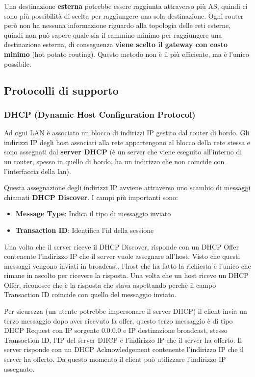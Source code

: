 \documentclass[a4paper]{article}
\begin{document}
\vspace{1em}
\noindent
Una destinazione \textbf{esterna} potrebbe essere raggiunta attraverso più AS, quindi ci
sono più possibilità di scelta per raggiungere una sola destinazione. Ogni router però non
ha nessuna informazione riguardo alla topologia delle reti esterne, quindi non può sapere
quale sia il cammino minimo per raggiungere una destinazione esterna, di conseguenza 
\textbf{viene scelto il gateway con costo minimo} (hot potato routing). Questo metodo
non è il più efficiente, ma è l'unico possibile.

\subsection{Protocolli di supporto}
\subsubsection{DHCP (Dynamic Host Configuration Protocol)}
Ad ogni LAN è associato un blocco di indirizzi IP gestito dal router di bordo. Gli
indirizzi IP degli host associati alla rete appartengono al blocco della rete stessa
e sono assegnati dal \textbf{server DHCP} (è un server che viene eseguito all'interno di
un router, spesso in quello di bordo, ha un indirizzo che non coincide con l'interfaccia
della lan).

\vspace{1em}
\noindent
Questa assegnazione degli indirizzi IP avviene attraverso uno scambio di messaggi
chiamati \textbf{DHCP Discover}. I campi più importanti sono:
\begin{itemize}
  \item \textbf{Message Type}: Indica il tipo di messaggio inviato
  \item \textbf{Transaction ID}: Identifica l'id della sessione
\end{itemize}
Una volta che il server riceve il DHCP Discover, risponde con un DHCP Offer contenente
l'indirizzo IP che il server vuole assegnare all'host. Visto che questi messaggi vengono
inviati in broadcast, l'host che ha fatto la richiesta è l'unico che rimane in ascolto
per ricevere la risposta. Una volta che un host riceve un DHCP Offer, riconosce che
è la risposta che stava aspettando perchè il campo Transaction ID coincide con quello
del messaggio inviato.

\vspace{1em}
\noindent
Per sicurezza (un utente potrebbe impersonare il server DHCP) il client invia un terzo
messaggio dopo aver ricevuto la offer, questo terzo messaggio è di tipo DHCP Request
con IP sorgente \( 0.0.0.0 \) e IP destinazione broadcast, stesso Transaction ID,
l'IP del server DHCP e l'indirizzo IP che il server ha offerto. Il server risponde con
un DHCP Acknowledgement contenente l'indirizzo IP che il server ha offerto. Da questo
momento il client può utilizzare l'indirizzo IP assegnato.
\end{document}
